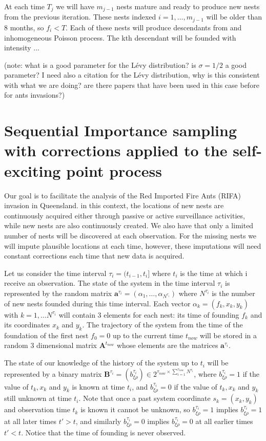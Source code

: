 \documentclass[11pt,a4paper]{article}
\renewcommand{\vec}[1]{\mathbf{#1}}
\begin{document}
{At each time $T_j$ we will have $m_{j-1}$ nests mature and ready to produce new nests from the previous iteration. These nests indexed $i = 1, \dots, m_{j-1}$ will be older than 8 months, so $f_i < T$. Each of these nests will produce descendants from and inhomogeneous Poisson process. The kth descendant will be founded with intensity ...

(note: what is a good parameter for the L\'evy distribution? is $\sigma = 1/2$ a good parameter? I need also a citation for the L\'evy distribution, why is this consistent with what we are doing? are there papers that have been used in this case before for ants invasions?)


\section{Sequential Importance sampling with corrections applied to the self-exciting point process}

Our goal is to facilitate the analysis of the Red Imported Fire Ants (RIFA) invasion in Queensland. in this context, the locations of new nests are continuously acquired either through passive or active surveillance activities, while new nests are also continuously created. We also have that only a limited number of nests will be discovered at each observation. For the missing nests we will impute plausible locations at each time, however, these imputations will need constant corrections each time that new data is acquired. 

Let us consider the time interval $\tau_i = (t_{i-1}, t_i]$ where $t_i$ is the time at which i receive an observation. The state of the system in the time interval $\tau_i$ is represented by the random matrix $\vec{a}^{\tau_i} = (\alpha_1, \dots, \alpha_{N^{\tau_i}})$ where $N^{\tau_i}$ is the number of new nests founded during this time interval. Each vector $\alpha_k = (f_k, x_k, y_k)$ with $k = 1, \dots N^{\tau_i}$ will contain 3 elements for each nest: its time of founding $f_k$ and its coordinates $x_k$ and $y_k$. The trajectory of the system from the time of the foundation of the first nest $f_0 = 0$ up to the current time $t_{now}$ will be stored in a random 3 dimensional matrix $\vec{A}^{t_{now}}$ whose elements are the matrices $\vec{a}^{\tau_i}$.

The state of our knowledge of the history of the system up to $t_{i}$ will be represented by a binary matrix $\vec{B}^{\tau_{i}} = (b^{\tau_i}_{\xi \rho}) \in 2^{\tau_{now} \times \sum_{i=1}^{\tau_{now}} N^{\tau_i}}$, where $b^{\tau_i}_{\xi \rho} = 1$ if the value of $t_k, x_k$ and $y_k$ is known at time $t_i$, and $b^{\tau_i}_{\xi \rho} = 0$ if the value of $t_k, x_k$ and $y_k$ still unknown at time $t_i$. Note that once a past system coordinate $s_k = (x_k, y_k)$ and observation time $t_k$ is known it cannot be unknown, so $b^{\tau_i}_{\xi \rho} = 1$ implies $b^{\tau_i}_{\xi \rho} = 1$ at all later times $t' > t$, and similarly $b^{\tau_i}_{\xi \rho} = 0$ implies $b^{\tau_i}_{\xi \rho} = 0$ at all earlier times $t' < t$. Notice that the time of founding is never observed.

}
\end{document}
